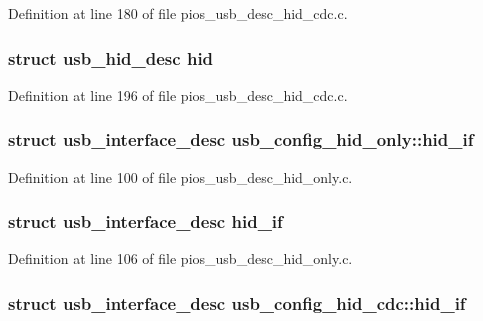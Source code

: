 Definition at line 180 of file pios\-\_\-usb\-\_\-desc\-\_\-hid\-\_\-cdc.\-c.

\hypertarget{group___p_i_o_s___u_s_b___d_e_s_c_ga6eb333cd7c6d156f25fa827aa085579c}{
\subsubsection[{hid}]{\setlength{\rightskip}{0pt plus 5cm}struct {\bf usb\-\_\-hid\-\_\-desc} hid}}\label{group___p_i_o_s___u_s_b___d_e_s_c_ga6eb333cd7c6d156f25fa827aa085579c}


Definition at line 196 of file pios\-\_\-usb\-\_\-desc\-\_\-hid\-\_\-cdc.\-c.

\hypertarget{group___p_i_o_s___u_s_b___d_e_s_c_gab8d4a603dbaaacc357e4beb426cfd094}{
\subsubsection[{hid\-\_\-if}]{\setlength{\rightskip}{0pt plus 5cm}struct {\bf usb\-\_\-interface\-\_\-desc} usb\-\_\-config\-\_\-hid\-\_\-only\-::hid\-\_\-if}}\label{group___p_i_o_s___u_s_b___d_e_s_c_gab8d4a603dbaaacc357e4beb426cfd094}


Definition at line 100 of file pios\-\_\-usb\-\_\-desc\-\_\-hid\-\_\-only.\-c.

\hypertarget{group___p_i_o_s___u_s_b___d_e_s_c_ga66dd41530dc7e219cf377870362857ce}{
\subsubsection[{hid\-\_\-if}]{\setlength{\rightskip}{0pt plus 5cm}struct {\bf usb\-\_\-interface\-\_\-desc} hid\-\_\-if}}\label{group___p_i_o_s___u_s_b___d_e_s_c_ga66dd41530dc7e219cf377870362857ce}


Definition at line 106 of file pios\-\_\-usb\-\_\-desc\-\_\-hid\-\_\-only.\-c.

\hypertarget{group___p_i_o_s___u_s_b___d_e_s_c_gadeb93743c31b647e20653e4423233982}{
\subsubsection[{hid\-\_\-if}]{\setlength{\rightskip}{0pt plus 5cm}struct {\bf usb\-\_\-interface\-\_\-desc} usb\-\_\-config\-\_\-hid\-\_\-cdc\-::hid\-\_\-if}}\label{group___p_i_o_s___u_s_b___d_e_s_c_gadeb93743c31b647e20653e4423233982}


